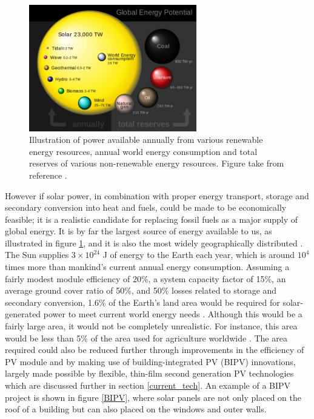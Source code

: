 \begin{figure}[h!]
  \centering
    \includegraphics[width=0.65\textwidth]{figures/global_energy.png}
    \caption{Illustration of power available annually from various renewable energy resources, annual world energy consumption and total reserves of various non-renewable energy resources. Figure take from reference .}
  \label{global_energy}
\end{figure}

However if solar power, in combination with proper energy transport, storage and secondary conversion into heat and fuels, could be made to be economically feasible; it is a realistic candidate for replacing fossil fuels as a major supply of global energy. It is by far the largest source of energy available to us, as illustrated in figure \ref{global_energy}, and it is also the most widely geographically distributed \cite{inorg_pv}. The Sun supplies $3 \times 10^{24}$ J of energy to the Earth each year, which is around $10^4$ times more than mankind's current annual energy consumption. 
Assuming a fairly modest module efficiency of 20\%, a system capacity factor of 15\%, an average ground cover ratio of 50\%, and 50\% losses related to storage and secondary conversion, 1.6\% of the Earth’s land area would be required for solar-generated power to meet current world energy needs \cite{newPVrev}. Although this would be a fairly large area, it would not be completely unrealistic. For instance, this area would be less than 5\% of the area used for agriculture worldwide \cite{newPVrev}. The area required could also be reduced further through improvements in the efficiency of PV module and by making use of building-integrated PV (BIPV) innovations, largely made possible by flexible, thin-film second generation PV technologies which are discussed further in section \ref{current_tech}. An example of a BIPV project is shown in figure \ref{BIPV}, where solar panels are not only placed on the roof of a building but can also placed on the windows and outer walls.

